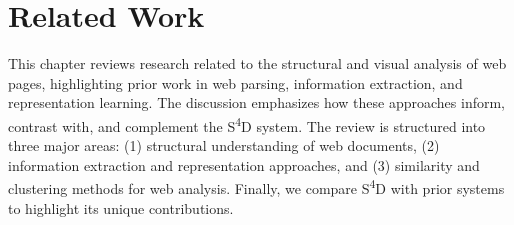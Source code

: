 \chapter{Related Work}
\label{ch:related-work}

This chapter reviews research related to the structural and visual analysis of web pages, highlighting prior work in web parsing, information extraction, and representation learning. The discussion emphasizes how these approaches inform, contrast with, and complement the S\textsuperscript{4}D system. The review is structured into three major areas: (1) structural understanding of web documents, (2) information extraction and representation approaches, and (3) similarity and clustering methods for web analysis. Finally, we compare S\textsuperscript{4}D with prior systems to highlight its unique contributions.






